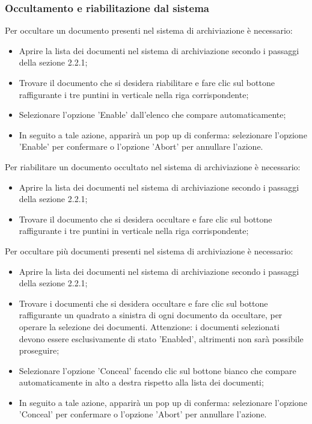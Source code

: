 \documentclass[10pt, a4paper]{article}
\begin{document}
\subsubsection{Occultamento e riabilitazione dal sistema}
Per occultare un documento presenti nel sistema di archiviazione è necessario:
\begin{itemize}
    \item Aprire la lista dei documenti nel sistema di archiviazione secondo i passaggi della sezione 2.2.1;
    \item Trovare il documento che si desidera riabilitare e fare clic sul bottone raffigurante i tre puntini in verticale nella riga corrispondente;
    \item Selezionare l'opzione 'Enable' dall'elenco che compare automaticamente;
    \item In seguito a tale azione, apparirà un pop up di conferma: selezionare l'opzione 'Enable' per confermare o l'opzione 'Abort' per annullare l'azione.
\end{itemize}
Per riabilitare un documento occultato nel sistema di archiviazione è necessario:
\begin{itemize}
    \item Aprire la lista dei documenti nel sistema di archiviazione secondo i passaggi della sezione 2.2.1;
    \item Trovare il documento che si desidera occultare e fare clic sul bottone raffigurante i tre puntini in verticale nella riga corrispondente;
\end{itemize}
Per occultare più documenti presenti nel sistema di archiviazione è necessario:
\begin{itemize}
    \item Aprire la lista dei documenti nel sistema di archiviazione secondo i passaggi della sezione 2.2.1;
    \item Trovare i documenti che si desidera occultare e fare clic sul bottone raffigurante un quadrato a sinistra di ogni documento da occultare, per operare la selezione dei documenti. Attenzione: i documenti selezionati devono essere esclusivamente di stato 'Enabled', altrimenti non sarà possibile proseguire;
    \item Selezionare l'opzione 'Conceal' facendo clic sul bottone bianco che compare automaticamente in alto a destra rispetto alla lista dei documenti; 
    \item In seguito a tale azione, apparirà un pop up di conferma: selezionare l'opzione 'Conceal' per confermare o l'opzione 'Abort' per annullare l'azione.
\end{itemize}
\end{document}
